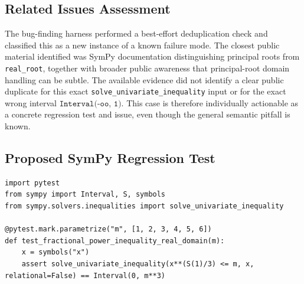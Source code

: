 \documentclass[11pt]{article}
\begin{document}
\subsection{Related Issues Assessment}

The bug-finding harness performed a best-effort deduplication check and
classified this as a new instance of a known failure mode. The closest public
material identified was SymPy documentation distinguishing principal roots from
\texttt{real\_root}, together with broader public awareness that principal-root
domain handling can be subtle. The available evidence did not identify a clear
public duplicate for this exact \texttt{solve\_univariate\_inequality} input or
for the exact wrong interval \(\texttt{Interval(-oo, 1)}\). This case is
therefore individually actionable as a concrete regression test and issue,
even though the general semantic pitfall is known.

\subsection{Proposed SymPy Regression Test}

\medskip

\begin{lstlisting}[style=bugpython]
import pytest
from sympy import Interval, S, symbols
from sympy.solvers.inequalities import solve_univariate_inequality

@pytest.mark.parametrize("m", [1, 2, 3, 4, 5, 6])
def test_fractional_power_inequality_real_domain(m):
    x = symbols("x")
    assert solve_univariate_inequality(x**(S(1)/3) <= m, x, relational=False) == Interval(0, m**3)
\end{lstlisting}
\end{document}
